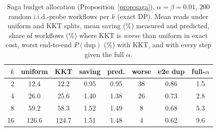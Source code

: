 \begin{table}[!htbp]
\centering
\caption{Saga budget allocation (Proposition~\ref{prop:saga}), $\alpha{=}\beta{=}0.01$, 200 random i.i.d.-probe workflows per $k$ (exact DP).
Mean reads under uniform and KKT splits, mean saving (\%) measured and predicted, share of workflows (\%) where KKT is \emph{worse} than uniform in
exact cost, worst end-to-end $P(\mathrm{dup})$ (\%) with KKT, and with every step given the full $\alpha$.}
\label{tab:saga}
\footnotesize
\setlength{\tabcolsep}{2.6pt}
\begin{tabular}{@{}r cc cc c cc@{}}
\toprule
$k$ & uniform & KKT & saving & pred. & worse & e2e dup & full-$\alpha$ \\
\midrule
2 & 12.4 & 12.2 & 0.95 & 0.95 & 38 & 0.86 & 1.5 \\
4 & 26.0 & 25.6 & 1.40 & 1.38 & 26 & 0.73 & 2.8 \\
8 & 59.2 & 58.3 & 1.52 & 1.49 & 8 & 0.68 & 5.3 \\
16 & 126.6 & 124.7 & 1.51 & 1.48 & 4 & 0.62 & 9.6 \\
\bottomrule
\end{tabular}
\end{table}
